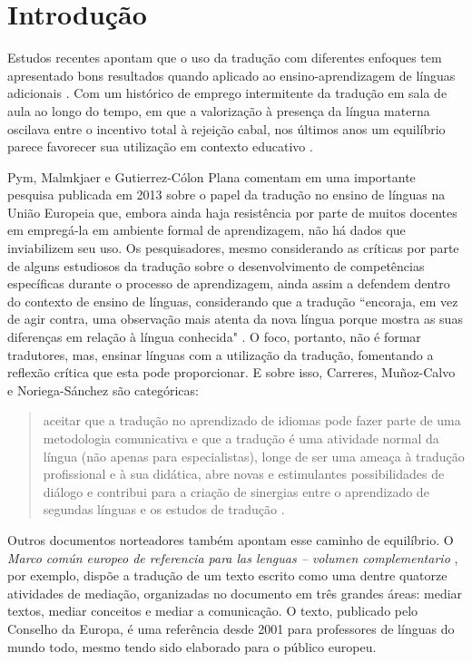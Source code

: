 \documentclass[portuguese]{textolivre}
\begin{document}
\section{Introdução}
Estudos recentes apontam que o uso da tradução com diferentes enfoques tem apresentado bons resultados quando aplicado ao ensino-aprendizagem de línguas adicionais \cite{carreres2019, pintado2019, bergmann2024}. Com um histórico de emprego intermitente da tradução em sala de aula ao longo do tempo, em que a valorização à presença da língua materna oscilava entre o incentivo total à rejeição cabal, nos últimos anos um equilíbrio parece favorecer sua utilização em contexto e\-ducativo \cite{bergmann2024}.

Pym, Malmkjaer e Gutierrez-Cólon Plana comentam em uma importante pesquisa publicada em 2013 sobre o papel da tradução no ensino de línguas na União Europeia que, embora ainda haja resistência por parte de muitos docentes em empregá-la em ambiente formal de aprendizagem, não há dados que inviabilizem seu uso. Os pesquisadores, mesmo considerando as críticas por parte de alguns estudiosos da tradução sobre o desenvolvimento de competências específicas durante o processo de aprendizagem, ainda assim a defendem dentro do contexto de ensino de línguas, considerando que a tradução “encoraja, em vez de agir contra, uma observação mais atenta da nova língua porque mostra as suas diferenças em relação à língua conhecida" \cite[p. 18, tradução nossa]{pym2013}.
O foco, portanto, não é formar tradutores, mas, ensinar línguas com a utilização da tradução, fomentando a reflexão crítica que esta pode proporcionar. E sobre isso, Carreres, Muñoz-Calvo e Noriega-Sánchez são categóricas:

\begin{quote}
aceitar que a tradução no aprendizado de idiomas pode fazer parte de uma metodologia comunicativa e que a tradução é uma atividade normal da língua (não apenas para especialistas), longe de ser uma ameaça à tradução profissional e à sua didática, abre novas e estimulantes possibilidades de diálogo e contribui para a criação de sinergias entre o aprendizado de segundas línguas e os estudos de tradução \cite[p. 102, tradução nossa]{carreres2019}.
\end{quote}

Outros documentos norteadores também apontam esse caminho de equilíbrio. O \textit{Marco común europeo de referencia para las lenguas – volumen complementario} \cite{consejo2022}, por exemplo, dispõe a tradução de um texto escrito como uma dentre quatorze atividades de mediação, organizadas no documento em três grandes áreas: mediar textos, mediar conceitos e mediar a comunicação. O texto, publicado pelo Conselho da Europa, é uma referência desde 2001 para professores de línguas do mundo todo, mesmo tendo sido elaborado para o público europeu.
\end{document}
